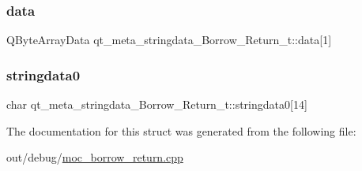 \subsubsection{\texorpdfstring{data}{data}}
{\footnotesize\ttfamily Q\+Byte\+Array\+Data qt\+\_\+meta\+\_\+stringdata\+\_\+\+Borrow\+\_\+\+Return\+\_\+t\+::data\mbox{[}1\mbox{]}}

\mbox{\label{structqt__meta__stringdata___borrow___return__t_af522534c107d37af9d99ec2fa61966a7}} 
\subsubsection{\texorpdfstring{stringdata0}{stringdata0}}
{\footnotesize\ttfamily char qt\+\_\+meta\+\_\+stringdata\+\_\+\+Borrow\+\_\+\+Return\+\_\+t\+::stringdata0\mbox{[}14\mbox{]}}



The documentation for this struct was generated from the following file\+:\begin{DoxyCompactItemize}
\item 
out/debug/\mbox{\hyperlink{moc__borrow__return_8cpp}{moc\+\_\+borrow\+\_\+return.\+cpp}}\end{DoxyCompactItemize}
